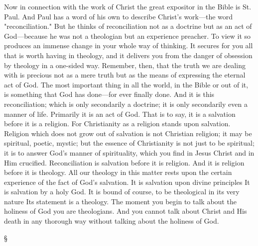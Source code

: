 \documentclass[12pt,letterpaper,oneside]{book}
\begin{document}
Now in connection with the work of Christ 
the great expositor in the Bible is St. Paul. 
And Paul has a word of his own to describe 
Christ's work---the word "reconciliation." But 
he thinks of reconciliation not as a doctrine but 
as an act of God---because he was not a theologian 
but an experience preacher. To view it 
so produces an immense change in your whole 
way of thinking. It secures for you all that 
is worth having in theology, and it delivers 
you from the danger of obsession by theology 
in a one-sided way. Remember, then, that the 
truth we are dealing with is precious not as a 
mere truth but as the means of expressing the 
eternal act of God. The most important thing 
in all the world, in the Bible or out of it, is 
something that God has done---for ever finally 
done. And it is this reconciliation; which is 
only secondarily a doctrine; it is only secondarily 
even a manner of life. Primarily it is an act of 
God. That is to say, it is a salvation before it is 
a religion. For Christianity as a religion stands 
upon salvation. Religion which does not grow 
out of salvation is not Christian religion; it 
may be spiritual, poetic, mystic; but the essence 
of Christianity is not just to be spiritual; it is 
to answer God's manner of spirituality, which 
you find in Jesus Christ and in Him crucified. 
Reconciliation is salvation before it is religion. 
And it is religion before it is theology. All 
our theology in this matter rests upon the 
certain experience of the fact of God's salvation. 
It is salvation upon divine principles 
It is salvation by a holy God. It is bound 
of course, to be theological in its very nature 
Its statement is a theology. The moment 
you begin to talk about the holiness of God 
you are theologians. And you cannot talk 
about Christ and His death in any thorough 
way without talking about the holiness of 
God. 

\begin{center}
\S 
\end{center} 
\end{document}
